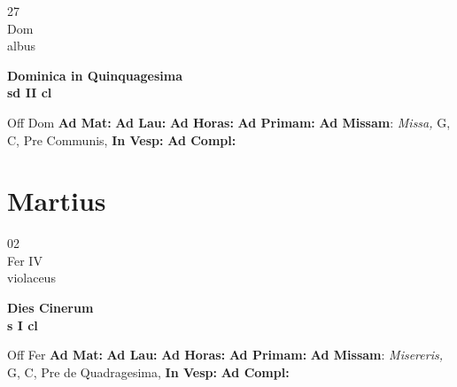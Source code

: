 \documentclass[10pt, openany]{book}
\begin{document}
    \begin{center}
        \begin{minipage}{3.5in}
            \vspace{2em}
            \begin{minipage}{0.5in}
                {\Huge 27} \\
                {\normalsize Dom} \\
                {\normalsize albus}
            \end{minipage}
            \begin{minipage}{3.0in}
                \textbf{ \large Dominica in Quinquagesima \\
                \textnormal{\normalsize sd II cl}} \\ 
            \end{minipage}
            \begin{justify}Off Dom
                \textbf{Ad Mat: }
                \textbf{Ad Lau: }
                \textbf{Ad Horas: }
                \textbf{Ad Primam: }\textbf{Ad Missam}: \textit{Missa,} G, C, Pre Communis,  
                \textbf{In Vesp: }
                \textbf{Ad Compl: }
            \end{justify}
        \end{minipage}
    \end{center}

    \chapter{Martius}
                    
    \begin{center}
        \begin{minipage}{3.5in}
            \vspace{2em}
            \begin{minipage}{0.5in}
                {\Huge 02} \\
                {\normalsize Fer IV} \\
                {\normalsize violaceus}
            \end{minipage}
            \begin{minipage}{3.0in}
                \textbf{ \large Dies Cinerum \\
                \textnormal{\normalsize s I cl}} \\ 
            \end{minipage}
            \begin{justify}Off Fer
                \textbf{Ad Mat: }
                \textbf{Ad Lau: }
                \textbf{Ad Horas: }
                \textbf{Ad Primam: }\textbf{Ad Missam}: \textit{Misereris,} G, C, Pre de Quadragesima,  
                \textbf{In Vesp: }
                \textbf{Ad Compl: }
            \end{justify}
        \end{minipage}
    \end{center}
\end{document}
